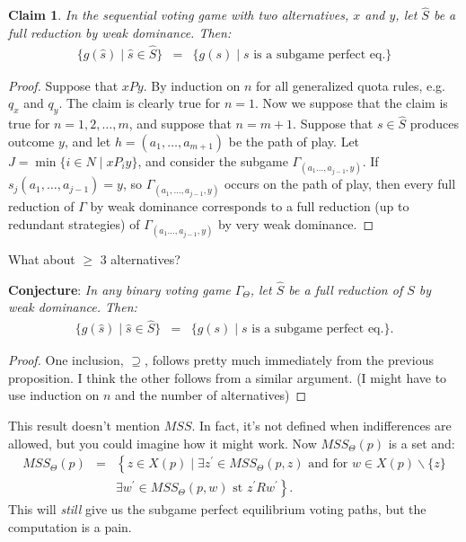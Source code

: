 \documentclass[12pt]{article}
\newtheorem{claimo}[propo]{Claim}
\newcommand{\n}{\noindent}
\newcommand{\s}{\vspace{5mm}}
\begin{document}
\s
\n  \begin{claimo}  In the sequential voting game with two alternatives, $x$ and $y$, let $\widehat{S}$ be a full reduction by weak dominance.  Then:
\begin{eqnarray*}
\{g(\widehat{s})\mid \widehat{s}\in\widehat{S}\}&=&\{g(s)\mid s\mbox{ is a subgame perfect eq.}\}
\end{eqnarray*}
\end{claimo}
\begin{proof}  Suppose that $xPy$.  By induction on $n$ for all generalized quota rules, e.g. $q_x$ and $q_y$.  The claim is clearly true for $n=1$.  Now we suppose that the claim is true for $n=1,2,\hdots,m$, and suppose that $n=m+1$.  Suppose that $s\in\widehat{S}$ produces outcome $y$, and let $h=(a_1,\hdots,a_{m+1})$ be the path of play.  Let $J=\min\{i\in N\mid xP_iy\}$, and consider the subgame $\Gamma_{(a_1\hdots,a_{j-1},y)}$.  If $s_j(a_1,\hdots,a_{j-1})=y$, so $\Gamma_{(a_1,\hdots,a_{j-1},y)}$ occurs on the path of play, then every full reduction of $\Gamma$ by weak dominance corresponds to a full reduction (up to redundant strategies) of $\Gamma_{(a_1\hdots,a_{j-1},y)}$ by very weak dominance.
\end{proof}

\s
\n What about $\geq$ 3 alternatives?

\s
\n  \textbf{Conjecture}:  \textit{In any binary voting game $\Gamma_{\Theta}$, let $\widehat{S}$ be a full reduction of $S$ by weak dominance.  Then:
\begin{eqnarray*}
\{g(\widehat{s})\mid \widehat{s}\in\widehat{S}\}&=&\{g(s)\mid s\mbox{ is a subgame perfect eq.}\}.
\end{eqnarray*}
} 
\begin{proof}  One inclusion, $\supseteq$, follows pretty much immediately from the previous proposition.  I think the other follows from a similar argument.  (I might have to use induction on $n$ and the number of alternatives)
\end{proof}

\s
\n  This result doesn't mention $MSS$.  In fact, it's not defined when indifferences are allowed, but you could imagine how it might work.  Now $MSS_{\Theta}(p)$ is a set and:
\begin{eqnarray*}
MSS_{\Theta}(p)&=&\left\{z\in X(p)\mid \exists z^{\prime}\in MSS_{\Theta}(p,z)\mbox{ and for }w\in X(p)\backslash\{z\}\right.\\
&&\left.\exists  w^{\prime}\in MSS_{\Theta}(p,w) \mbox{ st }z^{\prime} Rw^{\prime}\right\}.
\end{eqnarray*}  This will \textit{still} give us the subgame perfect equilibrium voting paths, but the computation is a pain.
\end{document}
